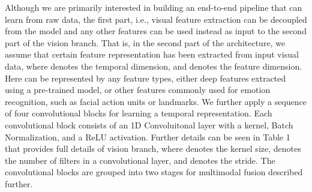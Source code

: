 \documentclass[a4paper,conference]{IEEEtran}
\begin{document}
Although we are primarily interested in building an end-to-end pipeline that can learn from raw data, the first part, i.e., visual feature extraction can be decoupled from the model and any other features can be used instead as input to the second part of the vision branch. That is, in the second part of the architecture, we assume that certain feature representation  has been extracted from input visual data, where  denotes the temporal dimension, and  denotes the feature dimension. Here  can be represented by any feature types, either deep features extracted using a pre-trained model, or other features commonly used for emotion recognition, such as facial action units or landmarks. We further apply a sequence of four convolutional blocks for learning a temporal representation. Each convolutional block consists of an 1D Convoluitonal layer with a  kernel, Batch Normalization, and a ReLU activation. Further details can be seen in Table 1 that provides full details of vision branch, where  denotes the kernel size,  denotes the number of filters in a convolutional layer, and  denotes the stride. The convolutional blocks are grouped into two stages for multimodal fusion described further.
\end{document}
